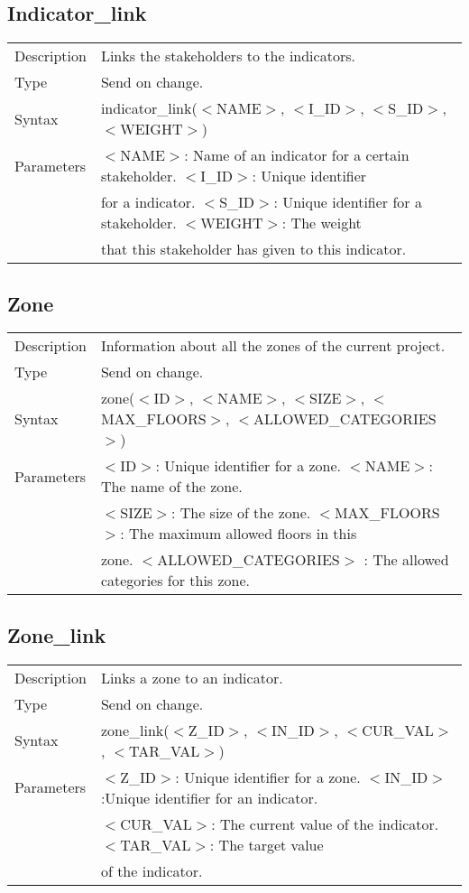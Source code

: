 \documentclass{article}
\begin{document}
\subsection*{Indicator\_link}

\begin{tabular}{ l l }
  Description & Links the stakeholders to the indicators.  \\
  Type & Send on change. \\
  Syntax & indicator\_link($<$NAME$>$, $<$I\_ID$>$, $<$S\_ID$>$, $<$WEIGHT$>$) \\
  Parameters &  $<$NAME$>$: Name of an indicator for a certain stakeholder. $<$I\_ID$>$: Unique identifier \\
    & for a indicator. $<$S\_ID$>$:  Unique identifier for a stakeholder. $<$WEIGHT$>$: The weight \\
    & that this stakeholder has given to this indicator.
\end{tabular}

\subsection*{Zone}

\begin{tabular}{ l l }
  Description & Information about all the zones of the current project. \\
  Type & Send on change. \\
  Syntax & zone($<$ID$>$, $<$NAME$>$, $<$SIZE$>$, $<$MAX\_FLOORS$>$, $<$ALLOWED\_CATEGORIES$>$) \\
  Parameters &  $<$ID$>$: Unique identifier for a zone. $<$NAME$>$: The name of the zone. \\
    & $<$SIZE$>$: The size of the zone. $<$MAX\_FLOORS$>$: The maximum allowed floors in this \\
    & zone. $<$ALLOWED\_CATEGORIES$>$ : The allowed categories for this zone.
\end{tabular}

\subsection*{Zone\_link}

\begin{tabular}{ l l }
  Description & Links a zone to an indicator.  \\
  Type & Send on change. \\
  Syntax & zone\_link($<$Z\_ID$>$, $<$IN\_ID$>$, $<$CUR\_VAL$>$, $<$TAR\_VAL$>$) \\
  Parameters &  $<$Z\_ID$>$: Unique identifier for a zone. $<$IN\_ID$>$:Unique identifier for an indicator. \\
    & $<$CUR\_VAL$>$: The current value of the indicator. $<$TAR\_VAL$>$:  The target value \\
    & of the indicator.
\end{tabular}
\end{document}
